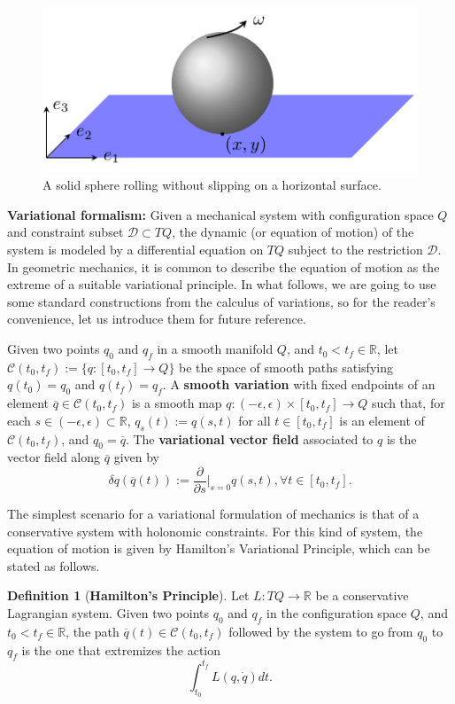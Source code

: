 \documentclass{aims}
\numberwithin{equation}{section}
\theoremstyle{definition}
\newtheorem{definition}[theorem]{Definition}
\begin{document}
\begin{figure}
  \centering
  \includegraphics[scale=1.2]{fig/esfera_que_rueda_sin_deslizarse.pdf}
  \caption{A solid sphere rolling without slipping on a horizontal surface.}
  \label{fig:esfera_que_rueda_sin_deslizarse}
\end{figure}

{\bf Variational formalism:} Given a mechanical system with configuration space $Q$ and constraint subset ${\mathcal D}\subset TQ$, the dynamic (or equation of motion) of the system is modeled by a differential equation on $TQ$ subject to the restriction ${\mathcal D}$. In geometric mechanics, it is common to describe the equation of motion as the extreme of a suitable variational principle. In what follows, we are going to use some standard constructions from the calculus of variations, so for the reader's convenience, let us introduce them for future reference.

Given two points $q_0$ and  $q_f$ in a smooth manifold $Q$, and $t_0<t_f\in \mathbb{R}$, let $\mathcal{C}(t_0, t_f) := \{q\colon[t_0, t_f]\to Q\}$ be the space of smooth paths satisfying $q(t_0) = q_0$ and $q(t_f) = q_f$. A {\bf smooth variation} with fixed endpoints of an element $\overline{q}\in \mathcal{C}(t_0, t_f)$ is a smooth map $q\colon (-\epsilon, \epsilon)\times [t_0, t_f]\to Q$ such that, for each $s\in (-\epsilon, \epsilon)\subset \mathbb{R}$, $q_s(t):= q(s, t)$ for all $t\in [t_0, t_f]$ is an element of $\mathcal{C}(t_0, t_f)$, and $q_0 = \overline{q}$. The {\bf variational vector field} associated to $q$ is the vector field along $\overline{q}$ given by
\[\delta q(\overline{q}(t)):= \frac{\partial}{\partial s}\Big|_{s=0}q(s, t), \forall t\in[t_0, t_f].\]

The simplest scenario for a variational formulation of mechanics is that of a conservative system with holonomic constraints. For this kind of system, the equation of motion is given by Hamilton's Variational Principle, which can be stated as follows.
\begin{definition}[{\bf Hamilton's Principle}]\label{
Hamilton-Principle}
  Let $L\colon TQ\to \mathbb{R}$ be a conservative Lagrangian system. Given two points $q_0$ and  $q_f$ in the configuration space $Q$, and $t_0<t_f\in \mathbb{R}$, the path $\overline{q}(t)\in \mathcal{C}(t_0, t_f)$ followed by the system to go from $q_0$ to $q_f$ is the one that extremizes the action
\[\int_{t_0}^{t_f}L(q, \dot{q})dt.\]
\end{definition}
\end{document}
